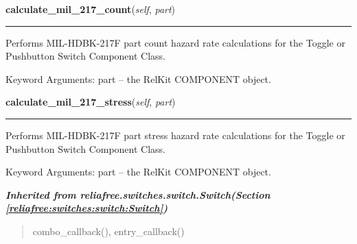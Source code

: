 \hspace{.8\funcindent}\begin{boxedminipage}{\funcwidth}

    \raggedright \textbf{calculate\_mil\_217\_count}(\textit{self}, \textit{part})

    \vspace{-1.5ex}

    \rule{\textwidth}{0.5\fboxrule}
\setlength{\parskip}{2ex}
    Performs MIL-HDBK-217F part count hazard rate calculations for the 
    Toggle or Pushbutton Switch Component Class.

    Keyword Arguments: part -- the RelKit COMPONENT object.

\setlength{\parskip}{1ex}
    \end{boxedminipage}

    \label{reliafree:switches:toggle:Toggle:calculate_mil_217_stress}

    \vspace{0.5ex}

\hspace{.8\funcindent}\begin{boxedminipage}{\funcwidth}

    \raggedright \textbf{calculate\_mil\_217\_stress}(\textit{self}, \textit{part})

    \vspace{-1.5ex}

    \rule{\textwidth}{0.5\fboxrule}
\setlength{\parskip}{2ex}
    Performs MIL-HDBK-217F part stress hazard rate calculations for the 
    Toggle or Pushbutton Switch Component Class.

    Keyword Arguments: part -- the RelKit COMPONENT object.

\setlength{\parskip}{1ex}
    \end{boxedminipage}


\large{\textbf{\textit{Inherited from reliafree.switches.switch.Switch\textit{(Section \ref{reliafree:switches:switch:Switch})}}}}

\begin{quote}
combo\_callback(), entry\_callback()
\end{quote}
